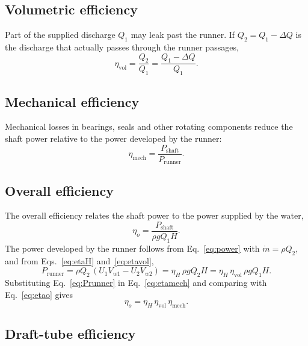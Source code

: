 \documentclass[11pt,a4paper]{article}
\numberwithin{equation}{section}
\begin{document}
\subsection{Volumetric efficiency}

Part of the supplied discharge $Q_1$ may leak past the runner. If $Q_2 = Q_1 - \Delta Q$ is the discharge that actually passes through the runner passages,
\begin{equation}
  \eta_{\mathrm{vol}} = \frac{Q_2}{Q_1} = \frac{Q_1 - \Delta Q}{Q_1}.
  \label{eq:etavol}
\end{equation}

\subsection{Mechanical efficiency}

Mechanical losses in bearings, seals and other rotating components reduce the shaft power relative to the power developed by the runner:
\begin{equation}
  \eta_{\mathrm{mech}} = \frac{P_{\mathrm{shaft}}}{P_{\mathrm{runner}}}.
  \label{eq:etamech}
\end{equation}

\subsection{Overall efficiency}

The overall efficiency relates the shaft power to the power supplied by the water,
\begin{equation}
  \eta_o = \frac{P_{\mathrm{shaft}}}{\rho g Q_1 H}.
  \label{eq:etao}
\end{equation}
The power developed by the runner follows from Eq.~\eqref{eq:power} with $\dot m = \rho Q_2$, and from Eqs.~\eqref{eq:etaH} and~\eqref{eq:etavol},
\begin{equation}
  P_{\mathrm{runner}} = \rho Q_2\,(U_1 V_{w1} - U_2 V_{w2}) = \eta_H\,\rho g Q_2 H = \eta_H\,\eta_{\mathrm{vol}}\,\rho g Q_1 H.
  \label{eq:Prunner}
\end{equation}
Substituting Eq.~\eqref{eq:Prunner} in Eq.~\eqref{eq:etamech} and comparing with Eq.~\eqref{eq:etao} gives
\begin{equation}
  \eta_o = \eta_H\,\eta_{\mathrm{vol}}\,\eta_{\mathrm{mech}}.
  \label{eq:etaproduct}
\end{equation}

\subsection{Draft-tube efficiency}
\end{document}
